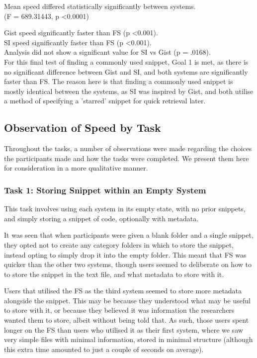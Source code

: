 Mean speed differed statistically significantly between systems. \\
(F = 689.31443, p \textless 0.0001)

Gist speed significantly faster than FS (p \textless  0.001). \\
SI speed significantly faster than FS (p \textless  0.001). \\
Analysis did not show a significant value for SI vs Gist (p = .0168). \\

For this final test of finding a commonly used snippet, Goal 1 is met, as there is no significant difference between Gist and SI, and both systems are significantly faster than FS.
The reason here is that finding a commonly used snippet is mostly identical between the systems, as SI was inspired by Gist, and both utilise a method of specifying a 'starred' snippet for quick retrieval later.


\subsection{Observation of Speed by Task} \label{observationanalysis}
Throughout the tasks, a number of observations were made regarding the choices the participants made and how the tasks were completed. 
We present them here for consideration in a more qualitative manner.

\subsubsection{Task 1: Storing Snippet within an Empty System}
This task involves using each system in its empty state, with no prior snippets, and simply storing a snippet of code, optionally with metadata.

It was seen that when participants were given a blank folder and a single snippet, they opted not to create any category folders in which to store the snippet, instead opting to simply drop it into the empty folder. 
This meant that FS was quicker than the other two systems, though users seemed to deliberate on how to to store the snippet in the text file, and what metadata to store with it.

Users that utilised the FS as the third system seemed to store more metadata alongside the snippet. 
This may be because they understood what may be useful to store with it, or because they believed it was information the researchers wanted them to store, albeit without being told that.
As such, those users spent longer on the FS than users who utilised it as their first system, where we saw very simple files with minimal information, stored in minimal structure (although this extra time amounted to just a couple of seconds on average).

